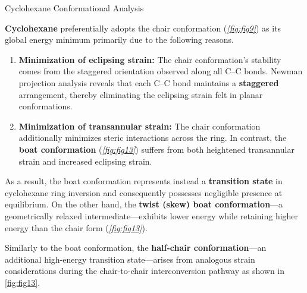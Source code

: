 \documentclass[10pt]{article}
\begin{document}
  \begin{core}{Cyclohexane Conformational Analysis}
 
    \textbf{Cyclohexane} preferentially adopts the chair conformation (\textit{\autoref{fig:fig9}}) as its global energy minimum primarily due to the following reasons.


    \begin{enumerate}

      \item \textbf{Minimization of eclipsing strain:} The chair conformation's stability comes from the staggered orientation observed along all C--C bonds. Newman projection analysis reveals that each C--C bond maintains a \textbf{staggered} arrangement, thereby eliminating the eclipsing strain felt in planar conformations.

       
      \item \textbf{Minimization of transannular strain:} The chair conformation additionally minimizes steric interactions across the ring. In contrast, the \textbf{boat conformation} (\textit{\autoref{fig:fig13}}) suffers from both heightened transannular strain and increased eclipsing strain.

    \end{enumerate} 
     
    As a result, the boat conformation represents instead a \textbf{transition state} in cyclohexane ring inversion and consequently possesses negligible presence at equilibrium. On the other hand, the \textbf{twist (skew) boat conformation}---a geometrically relaxed intermediate---exhibits lower energy while retaining higher energy than the chair form (\textit{\autoref{fig:fig13}}).

     
    Similarly to the boat conformation, the \textbf{half-chair conformation}---an additional high-energy transition state---arises from analogous strain considerations during the chair-to-chair interconversion pathway as shown in \autoref{fig:fig13}.

            
  \end{core}
\end{document}
